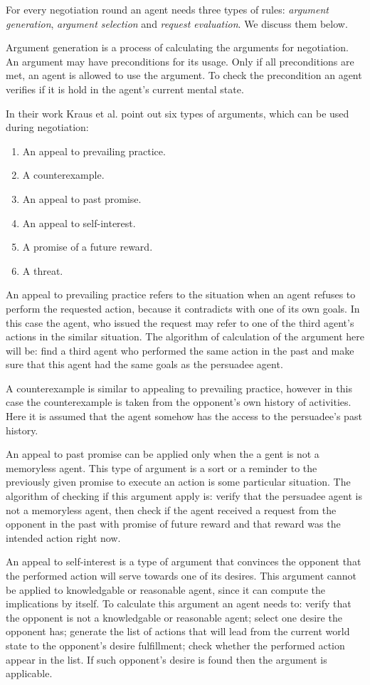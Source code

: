 For every negotiation round an agent needs three types of rules: \emph{argument generation}, \emph{argument selection} and \emph{request evaluation}.
We discuss them below.

Argument generation is a process of calculating the arguments for negotiation.
An argument may have preconditions for its usage.
Only if all preconditions are met, an agent is allowed to use the argument.
To check the precondition an agent verifies if it is hold in the agent's current mental state.

In their work Kraus et al. \cite{Kraus_98} point out six types of arguments, which can be used during negotiation:
\begin{enumerate}
  \item An appeal to prevailing practice.
  \item A counterexample.
  \item An appeal to past promise.
  \item An appeal to self-interest.
  \item A promise of a future reward.
  \item A threat.
\end{enumerate}

An appeal to prevailing practice refers to the situation when an agent refuses to perform the requested action, because it contradicts with one of its own goals.
In this case the agent, who issued the request may refer to one of the third agent's actions in the similar situation.
The algorithm of calculation of the argument here will be: find a third agent who performed the same action in the past and make sure that this agent had the same goals as the persuadee agent.

A counterexample is similar to appealing to prevailing practice, however in this case the counterexample is taken from the opponent's own history of activities.
Here it is assumed that the agent somehow has the access to the persuadee's past history.

An appeal to past promise can be applied only when the a gent is not a memoryless agent.
This type of argument is a sort or a reminder to the previously given promise to execute an action is some particular situation.
The algorithm of checking if this argument apply is: verify that the persuadee agent is not a memoryless agent, then check if the agent received a request from the opponent in the past with promise of future reward and that reward was the intended action right now.

An appeal to self-interest is a type of argument that convinces the opponent that the performed action will serve towards one of its desires.
This argument cannot be applied to knowledgable or reasonable agent, since it can compute the implications by itself.
To calculate this argument an agent needs to: verify that the opponent is not a knowledgable or reasonable agent; select one desire the opponent has; generate the list of actions that will lead from the current world state to the opponent's desire fulfillment; check whether the performed action appear in the list.
If such opponent's desire is found then the argument is applicable.

